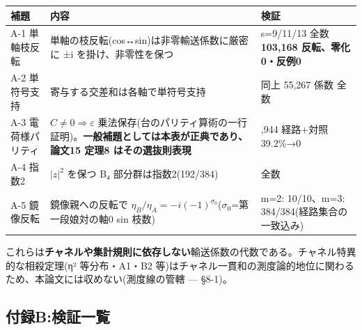 \documentclass[
]{ltjsarticle}
\newcounter{none} %
\begin{document}
{\def\LTcaptype{none} %
\begin{longtable}[]{@{}
  >{\raggedright\arraybackslash}p{}
  >{\raggedright\arraybackslash}p{}
  >{\raggedright\arraybackslash}p{}@{}}
\toprule\noalign{}
\begin{minipage}[b]{\linewidth}\raggedright
補題
\end{minipage} & \begin{minipage}[b]{\linewidth}\raggedright
内容
\end{minipage} & \begin{minipage}[b]{\linewidth}\raggedright
検証
\end{minipage} \\
\midrule\noalign{}
\endhead
\bottomrule\noalign{}
\endlastfoot
A-1 単軸枝反転 & 単軸の枝反転(cos↔sin)は非零輸送係数に厳密に ±i
を掛け、非零性を保つ & s=9/11/13 全数 \textbf{103,168
反転、零化0・反例0} \\
A-2 単符号支持 & 寄与する交差和は各軸で単符号支持 & 同上 55,267 係数
全数 \\
A-3 電荷様パリティ & \(C\neq0\Rightarrow\varepsilon\)
乗法保存(台のパリティ算術の一行証明)。\textbf{一般補題としては本表が正典であり、論文15
定理8 はその選抜則表現} & 118,944 経路+対照 39.2\%→0 \\
A-4 指数2 & \(|z|^2\) を保つ B₄ 部分群は指数2(192/384) & 全数 \\
A-5 鏡像反転 & 鏡像親への反転で
\(\eta_B/\eta_A=-i(-1)^{\sigma_0}\)(\(\sigma_0\)=第一段娘対の軸0 sin
枝数) & m=2: 10/10、m=3: 384/384(経路集合の一致込み) \\
\end{longtable}
}

これらは\textbf{チャネルや集計規則に依存しない}輸送係数の代数である。チャネル特異的な相殺定理(η²
等分布・A1・B2
等)はチャネル一貫和の測度論的地位に関わるため、本論文には収めない(測度線の管轄
--- §8-1)。

\subsection{付録B:検証一覧}\label{ux4ed8ux9332bux691cux8a3cux4e00ux89a7}
\end{document}
